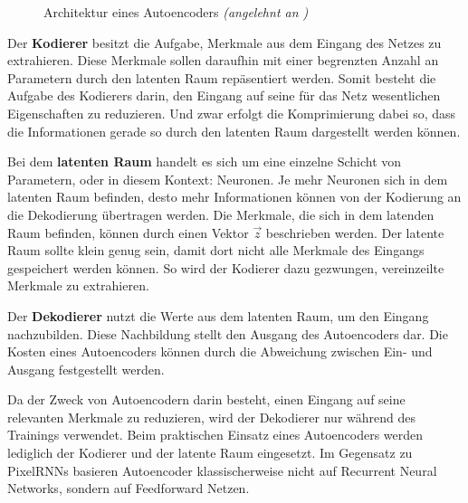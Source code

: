 \begin{figure}[h]
   \caption{Architektur eines Autoencoders \emph{(angelehnt an \cite{autoencoder-img})}}
   \label{fig:Autoencoder}
\end{figure}

Der \textbf{Kodierer} besitzt die Aufgabe, Merkmale aus dem Eingang des Netzes zu extrahieren. Diese Merkmale sollen daraufhin mit einer begrenzten Anzahl an Parametern durch den latenten Raum repäsentiert werden. Somit besteht die Aufgabe des Kodierers darin, den Eingang auf seine für das Netz wesentlichen Eigenschaften zu reduzieren. Und zwar erfolgt die Komprimierung dabei so, dass die Informationen gerade so durch den latenten Raum dargestellt werden können. \cite{autoencoder}

Bei dem \textbf{latenten Raum} handelt es sich um eine einzelne Schicht von Parametern, oder in diesem Kontext: Neuronen. Je mehr Neuronen sich in dem latenten Raum befinden, desto mehr Informationen können von der Kodierung an die Dekodierung übertragen werden. Die Merkmale, die sich in dem latenden Raum befinden, können durch einen Vektor $\vec{z}$ beschrieben werden. Der latente Raum sollte klein genug sein, damit dort nicht alle Merkmale des Eingangs gespeichert werden können. So wird der Kodierer dazu gezwungen, vereinzeilte Merkmale zu extrahieren. \cite{autoencoder}

Der \textbf{Dekodierer} nutzt die Werte aus dem latenten Raum, um den Eingang nachzubilden. Diese Nachbildung stellt den Ausgang des Autoencoders dar. Die Kosten eines Autoencoders können durch die Abweichung zwischen Ein- und Ausgang festgestellt werden. \cite{autoencoder}

Da der Zweck von Autoencodern darin besteht, einen Eingang auf seine relevanten Merkmale zu reduzieren, wird der Dekodierer nur während des Trainings verwendet. Beim praktischen Einsatz eines Autoencoders werden lediglich der Kodierer und der latente Raum eingesetzt. Im Gegensatz zu \acp{PixelRNN} basieren Autoencoder klassischerweise nicht auf Recurrent Neural Networks, sondern auf Feedforward Netzen. \cite{generativeModelsSurvey}

